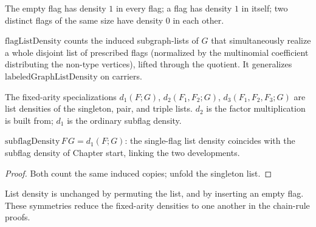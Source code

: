 \begin{lemma}
  \label{lem:subflag-density-values}
  \leanok
  The empty flag has density $1$ in every flag; a flag has density $1$ in
  itself; two distinct flags of the same size have density $0$ in each other.
\end{lemma}

\begin{definition}
  \label{def:flag-list-density}
  \leanok
  $\mathrm{flagListDensity}$ counts the induced subgraph-lists of $G$ that
  simultaneously realize a whole disjoint list of prescribed flags (normalized by
  the multinomial coefficient distributing the non-type vertices), lifted through
  the quotient. It generalizes $\mathrm{labeledGraphListDensity}$ on carriers.
\end{definition}

\begin{definition}
  \label{def:flag-density-n}
  \leanok
  The fixed-arity specializations
  $d_1(F;G)$, $d_2(F_1,F_2;G)$, $d_3(F_1,F_2,F_3;G)$ are list densities of the
  singleton, pair, and triple lists. $d_2$ is the factor multiplication is built
  from; $d_1$ is the ordinary subflag density.
\end{definition}

\begin{theorem}
  \label{thm:subflag-eq-list}
  \leanok
  $\mathrm{subflagDensity}\,F\,G = d_1(F;G)$: the single-flag list density
  coincides with the subflag density of Chapter start, linking the two
  developments.
\end{theorem}
\begin{proof}\leanok
  Both count the same induced copies; unfold the singleton list.
\end{proof}

\begin{lemma}
  \label{lem:density-invariance}
  \leanok
  List density is unchanged by permuting the list, and by inserting an empty
  flag. These symmetries reduce the fixed-arity densities to one another in the
  chain-rule proofs.
\end{lemma}

